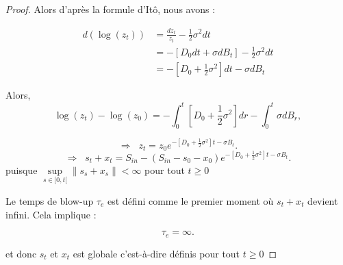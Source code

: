 \documentclass[12pt,a4paper]{report}%
\begin{document}
\begin{proof}
 	Alors d'après la formule d'Itô, nous avons :
 	
 	\[
 	\begin{aligned}
 		d(\log(z_t)) &= \frac{dz_t}{z_t} - \frac{1}{2}\sigma^2 dt\\
 		&=-[D_0dt + \sigma dB_t] - \frac{1}{2}\sigma^2 dt\\
 		&=-[D_0+ \frac{1}{2}\sigma^2 ]dt - \sigma dB_t
 	\end{aligned}
 	\]
 	
 	
 	Alors,
 	\[
 	\log(z_t) - \log(z_0) = -\int_0^t [D_0+ \frac{1}{2}\sigma^2 ]dr - \int_0^t  \sigma dB_r,
 	\]
 	
 	\[
 	\Rightarrow \;\; z_t = z_0 e^{- [D_0+ \frac{1}{2}\sigma^2 ] t - \sigma B_t}.
 	\]
 	\[
 	\Rightarrow \;\; s_t+x_t =S_{in}-(S_{in}-s_0-x_0) e^{- [D_0+ \frac{1}{2}\sigma^2 ] t - \sigma B_t}.
 	\]
 	puisque $\sup\limits_{s \in [0, t[} \|s_s+x_s\|<\infty $ pour tout $t \geqslant 0$ 
 	
 	Le temps de blow-up \( \tau_e \) est défini comme le premier moment où \( s_t + x_t \) devient infini. Cela implique :
 	
 	\[ \tau_e = \infty. \]
 	
 	et donc \(s_t\) et \(x_t\) est globale c'est-à-dire définis pour tout \( t \geqslant 0\)
 \end{proof}
 
\end{document}
